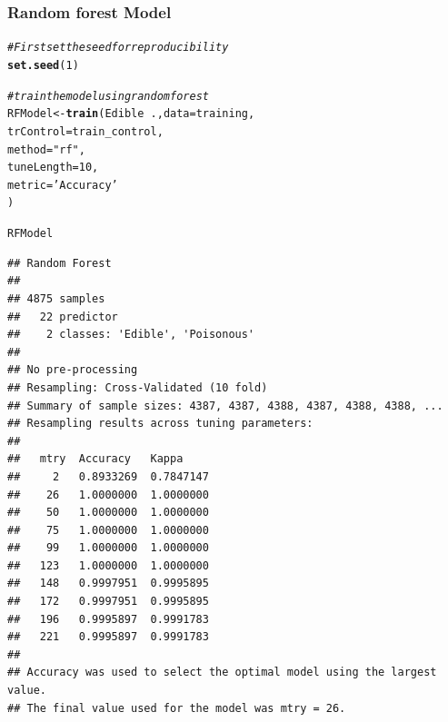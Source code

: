 \documentclass[10pt  ,usenames, dvipsnames]{article}\usepackage[]{graphicx}\usepackage[]{color}
\makeatletter
\newcommand{\hlnum}[1]{\textcolor[rgb]{0.686,0.059,0.569}{#1}}%
\newcommand{\hlstr}[1]{\textcolor[rgb]{0.192,0.494,0.8}{#1}}%
\newcommand{\hlcom}[1]{\textcolor[rgb]{0.678,0.584,0.686}{\textit{#1}}}%
\newcommand{\hlopt}[1]{\textcolor[rgb]{0,0,0}{#1}}%
\newcommand{\hlstd}[1]{\textcolor[rgb]{0.345,0.345,0.345}{#1}}%
\newcommand{\hlkwb}[1]{\textcolor[rgb]{0.69,0.353,0.396}{#1}}%
\newcommand{\hlkwc}[1]{\textcolor[rgb]{0.333,0.667,0.333}{#1}}%
\newcommand{\hlkwd}[1]{\textcolor[rgb]{0.737,0.353,0.396}{\textbf{#1}}}%
\newenvironment{kframe}{%
 \def\at@end@of@kframe{}%
 \ifinner\ifhmode%
  \def\at@end@of@kframe{\end{minipage}}%
  \begin{minipage}{\columnwidth}%
 \fi\fi%
 \def\FrameCommand##1{\hskip\@totalleftmargin \hskip-\fboxsep
 \colorbox{shadecolor}{##1}\hskip-\fboxsep
     \hskip-\linewidth \hskip-\@totalleftmargin \hskip\columnwidth}%
 \MakeFramed {\advance\hsize-\width
   \@totalleftmargin\z@ \linewidth\hsize
   \@setminipage}}%
 {\par\unskip\endMakeFramed%
 \at@end@of@kframe}
\newenvironment{knitrout}{}{} %
\makeatother
\begin{document}
\clearpage

\subsubsection{Random forest Model}

\begin{knitrout}
\color{fgcolor}\begin{kframe}
\begin{alltt}
\hlcom{#First set the seed for reproducibility}
\hlkwd{set.seed}\hlstd{(}\hlnum{1}\hlstd{)}

\hlcom{# train the model using random forest}
\hlstd{RFModel}\hlkwb{<-} \hlkwd{train}\hlstd{(Edible}\hlopt{~}\hlstd{.,} \hlkwc{data}\hlstd{=training,}
                \hlkwc{trControl}\hlstd{=train_control,}
                \hlkwc{method}\hlstd{=}\hlstr{"rf"}\hlstd{,}
                \hlkwc{tuneLength} \hlstd{=}\hlnum{10}\hlstd{,}
                \hlkwc{metric} \hlstd{=} \hlstr{'Accuracy'}
\hlstd{)}
\end{alltt}
\end{kframe}
\end{knitrout}




\begin{knitrout}
\color{fgcolor}\begin{kframe}
\begin{alltt}
\hlstd{RFModel}
\end{alltt}
\end{kframe}
\end{knitrout}


\begin{knitrout}
\color{fgcolor}\begin{kframe}
\begin{verbatim}
## Random Forest 
## 
## 4875 samples
##   22 predictor
##    2 classes: 'Edible', 'Poisonous' 
## 
## No pre-processing
## Resampling: Cross-Validated (10 fold) 
## Summary of sample sizes: 4387, 4387, 4388, 4387, 4388, 4388, ... 
## Resampling results across tuning parameters:
## 
##   mtry  Accuracy   Kappa    
##     2   0.8933269  0.7847147
##    26   1.0000000  1.0000000
##    50   1.0000000  1.0000000
##    75   1.0000000  1.0000000
##    99   1.0000000  1.0000000
##   123   1.0000000  1.0000000
##   148   0.9997951  0.9995895
##   172   0.9997951  0.9995895
##   196   0.9995897  0.9991783
##   221   0.9995897  0.9991783
## 
## Accuracy was used to select the optimal model using the largest value.
## The final value used for the model was mtry = 26.
\end{verbatim}
\end{kframe}
\end{knitrout}
\end{document}
